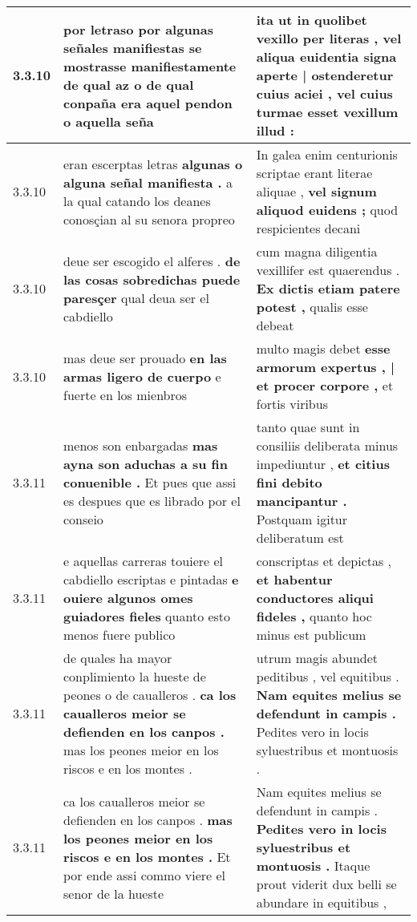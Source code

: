 \begin{tabular}{|p{1cm}|p{6.5cm}|p{6.5cm}|}
3.3.10 & por \textbf{ letraso por algunas señales manifiestas se mostrasse manifiestamente } de qual az o de qual conpaña era aquel pendon o aquella seña & ita ut in quolibet vexillo per literas , \textbf{ vel aliqua euidentia signa aperte | ostenderetur cuius aciei , } vel cuius turmae esset vexillum illud : \\\hline
3.3.10 & eran escerptas letras \textbf{ algunas o alguna señal manifiesta . } a la qual catando los deanes conosçian al su senora propreo & In galea enim centurionis scriptae erant literae aliquae , \textbf{ vel signum aliquod euidens ; } quod respicientes decani \\\hline
3.3.10 & deue ser escogido el alferes . \textbf{ de las cosas sobredichas puede paresçer } qual deua ser el cabdiello & cum magna diligentia vexillifer est quaerendus . \textbf{ Ex dictis etiam patere potest , } qualis esse debeat \\\hline
3.3.10 & mas deue ser prouado \textbf{ en las armas ligero de cuerpo } e fuerte en los mienbros & multo magis debet \textbf{ esse armorum expertus , | et procer corpore , } et fortis viribus \\\hline
3.3.11 & menos son enbargadas \textbf{ mas ayna son aduchas a su fin conuenible . } Et pues que assi es despues que es librado por el conseio & tanto quae sunt in consiliis deliberata minus impediuntur , \textbf{ et citius fini debito mancipantur . } Postquam igitur deliberatum est \\\hline
3.3.11 & e aquellas carreras touiere el cabdiello escriptas e pintadas \textbf{ e ouiere algunos omes guiadores fieles } quanto esto menos fuere publico & conscriptas et depictas , \textbf{ et habentur conductores aliqui fideles , } quanto hoc minus est publicum \\\hline
3.3.11 & de quales ha mayor conplimiento la hueste de peones o de caualleros . \textbf{ ca los caualleros meior se defienden en los canpos . } mas los peones meior en los riscos e en los montes . & utrum magis abundet peditibus , vel equitibus . \textbf{ Nam equites melius se defendunt in campis . } Pedites vero in locis syluestribus et montuosis . \\\hline
3.3.11 & ca los caualleros meior se defienden en los canpos . \textbf{ mas los peones meior en los riscos e en los montes . } Et por ende assi commo viere el senor de la hueste & Nam equites melius se defendunt in campis . \textbf{ Pedites vero in locis syluestribus et montuosis . } Itaque prout viderit dux belli se abundare in equitibus , \\\hline

\end{tabular}
